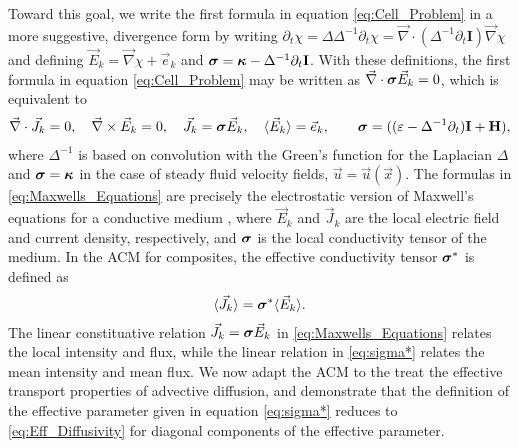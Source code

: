 \documentclass[11pt]{amsart}
\newcommand{\Hb}{\mathbf{H}}
\newcommand{\Ib}{\mathbf{I}}
\newcommand\bsig{\mbox{\boldmath${\sigma}$}}
\newcommand\bkappa{\mbox{\boldmath${\kappa}$}}
\begin{document}
Toward this goal, we write the first formula in equation
\eqref{eq:Cell_Problem} in a more suggestive, divergence form
\cite{Fannjiang:SIAM_JAM:333} by
writing  $\partial_t\chi=\Delta\Delta^{-1}\partial_t\chi=\vec{\nabla}\cdot(\Delta^{-1}\partial_t\Ib)\vec{\nabla}\chi$ and
defining $\vec{E}_k=\vec{\nabla}\chi+\vec{e}_k$ and
$\bsig
=\bkappa-\Delta^{-1}\partial_t\Ib
$.
With these definitions, the first formula in
equation \eqref{eq:Cell_Problem} may be written as
$\vec{\nabla}\cdot\bsig\vec{E}_k=0$, which is equivalent to
\cite{Fannjiang:SIAM_JAM:333}      
%
\begin{align}\label{eq:Maxwells_Equations}    
  \vec{\nabla}\cdot\vec{J}_k=0, \quad
  \vec{\nabla}\times\vec{E}_k=0, \quad
  \vec{J}_k=\bsig\vec{E}_k,\quad
  \langle\vec{E}_k\rangle=\vec{e}_k,\qquad
  \bsig%
       =((\varepsilon-\Delta^{-1}\partial_t)\Ib+\Hb),
\end{align}
%
where $\Delta^{-1}$ is based on convolution with the Green's function for
the Laplacian $\Delta$ and $\bsig=\bkappa$ in the case of steady fluid
velocity fields, $\vec{u}=\vec{u}(\vec{x})$. The formulas in
\eqref{eq:Maxwells_Equations} are  
precisely the electrostatic version of Maxwell's equations for a
conductive medium \cite{Golden:CMP-473}, where $\vec{E}_k$ and
$\vec{J}_k$ are the local electric field and current density,
respectively, and $\bsig$ is the local conductivity tensor of the
medium. In the ACM for composites, the effective conductivity tensor
$\bsig^*$ is defined as
% 
\begin{align}\label{eq:sigma*}
  \langle\vec{J}_k\rangle=\bsig^*\langle\vec{E}_k\rangle.
\end{align}
%
The linear constituative relation $\vec{J}_k=\bsig\vec{E}_k$ in
\eqref{eq:Maxwells_Equations} relates the local intensity and flux,
while the linear relation in \eqref{eq:sigma*} relates the mean
intensity and mean flux. We now adapt the ACM to the treat the
effective transport properties of advective diffusion, and demonstrate
that the definition of the effective parameter given in equation
\eqref{eq:sigma*} reduces to \eqref{eq:Eff_Diffusivity} 
for diagonal components of the effective parameter.
\end{document}
